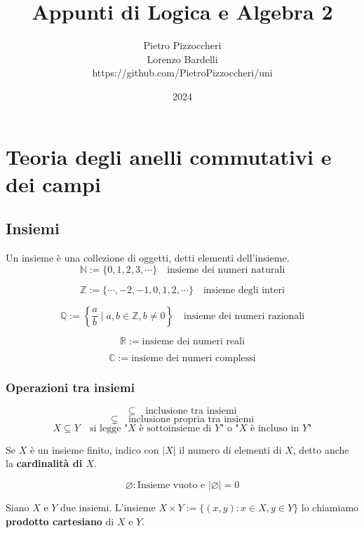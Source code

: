 \documentclass[a4paper,12pt]{article}
\title{Appunti di Logica e Algebra 2}
\author{Pietro Pizzoccheri \\ Lorenzo Bardelli \\ https://github.com/PietroPizzoccheri/uni}
\date{2024}
\theoremstyle{def}
\theoremstyle{prop}
\theoremstyle{esempio}
\theoremstyle{dimostrazione}
\theoremstyle{teo}
\theoremstyle{osservazione}
\begin{document}
\maketitle

\tableofcontents

\newpage
\section{Teoria degli anelli commutativi e dei campi}


\subsection{Insiemi}

Un insieme è una collezione di oggetti, detti elementi dell'insieme.
\[
    \mathbb{N} := \{ 0,1,2,3,\cdots\} \quad \text{insieme dei numeri naturali}
\]

\[
    \mathbb{Z} := \{ \cdots,-2,-1,0,1,2,\cdots\} \quad \text{insieme degli interi}
\]

\[
    \mathbb{Q} := \left\{ \frac{a}{b} \mid a,b \in \mathbb{Z}, b \neq 0
    \right\} \quad \text{insieme dei numeri razionali}
\]

\[
    \mathbb{R} := \text{insieme dei numeri reali}
\]

\[
    \mathbb{C} := \text{insieme dei numeri complessi}
\]

\subsubsection{Operazioni tra insiemi}

\[
    \subseteq \quad \text{inclusione tra insiemi}
\]
\[
    \subsetneq \quad \text{inclusione propria tra insiemi}
\]
\[
    X \subseteq Y \quad \text{si legge "} X \text{ è sottoinsieme di }Y \text{"
        o "} X \text{ è incluso in } Y\text{"}
\]

Se \(X\) è un insieme finito, indico con \(|X|\) il numero di elementi di
\(X\), detto anche la \textbf{cardinalità di \(X\)}.

\[\varnothing : \text{Insieme vuoto e } |\varnothing| = 0\]

Siano \(X\) e \(Y\) due insiemi. L'insieme \begin{math}
    X \times Y := \{ (x,y) : x \in X , y \in Y \}
\end{math} lo chiamiamo \textbf{prodotto cartesiano} di \(X\) e \(Y\).
\vspace{\baselineskip}
\end{document}
